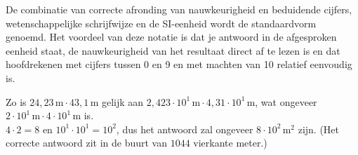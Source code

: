 \documentclass{ximera}
\begin{document}
De combinatie van correcte afronding van nauwkeurigheid en beduidende cijfers, wetenschappelijke schrijfwijze en de SI-eenheid wordt de standaardvorm genoemd. Het voordeel van deze notatie is dat je antwoord in de afgesproken eenheid staat, de nauwkeurigheid van het resultaat direct af te lezen is en dat hoofdrekenen met cijfers tussen 0 en 9 en met machten van 10 relatief eenvoudig is.

\begin{example}\nl
    Zo is $24{,}23 \, \mathrm{m} \cdot 43{,}1 \, \mathrm{m}$ gelijk aan $2{,}423 \cdot 10^1 \, \mathrm{m} \cdot 4{,}31 \cdot 10^1 \, \mathrm{m}$, wat ongeveer $2 \cdot 10^1 \, \mathrm{m} \cdot 4 \cdot 10^1 \, \mathrm{m}$ is.\\
    $4 \cdot 2 = 8$ en $10^{1} \cdot 10^{1} = 10^{2}$, dus het antwoord zal ongeveer $8 \cdot 10^2 \, \mathrm{m}^{2}$ zijn. (Het correcte antwoord zit in de buurt van $1044$ vierkante meter.)
\end{example}
\end{document}
